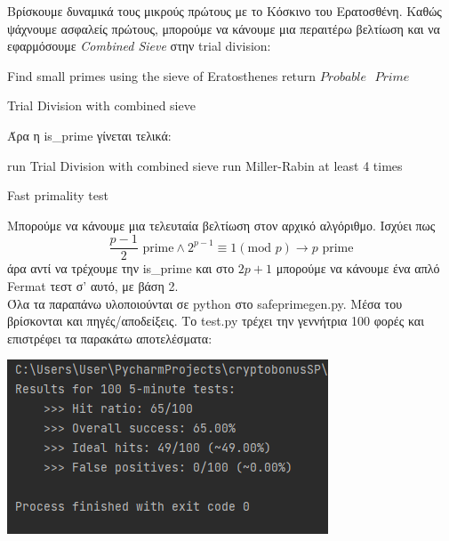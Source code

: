 \documentclass{article}
\newcommand{\lt}[1]{\latintext #1\greektext}
\begin{document}
{    Βρίσκουμε δυναμικά τους μικρούς πρώτους με το Κόσκινο του Ερατοσθένη. Καθώς ψάχνουμε ασφαλείς πρώτους, μπορούμε να κάνουμε μια περαιτέρω βελτίωση και να εφαρμόσουμε \textit{\lt{Combined Sieve}} στην \lt{trial division}:

    \begin{algorithm}
        \Large
        \latintext
        Find small primes using the sieve of Eratosthenes\;
        return $Probable\text{ }Prime$
        \caption{\large Trial Division with combined sieve}
    \end{algorithm}

    Άρα η \lt{is\_prime} γίνεται τελικά:

     \begin{algorithm}
        \Large
        \latintext
        run Trial Division with combined sieve\;
        run Miller-Rabin at least 4 times\;
        
        \caption{Fast primality test}
    \end{algorithm}

    Μπορούμε να κάνουμε μια τελευταία βελτίωση στον αρχικό αλγόριθμο. Ισχύει πως
    \lt{\begin{equation*}
        \frac{p-1}{2} \text{ prime} \land 2^{p - 1} \equiv 1 (\text{mod }p) \rightarrow p \text{ prime}
    \end{equation*}}
    άρα αντί να τρέχουμε την \lt{is\_prime} και στο $2p+1$ μπορούμε να κάνουμε ένα απλό \lt{Fermat} τεστ σ' αυτό, με βάση 2.\\

    Όλα τα παραπάνω υλοποιούνται σε \lt{python} στο \lt{safeprimegen.py}. Μέσα του βρίσκονται και πηγές/αποδείξεις. Το \lt{test.py} τρέχει την γεννήτρια 100 φορές και επιστρέφει τα παρακάτω αποτελέσματα:
    \begin{center}
        \includegraphics[scale=1]{images/results-sp-test1.png}
    \end{center}

}
\end{document}
